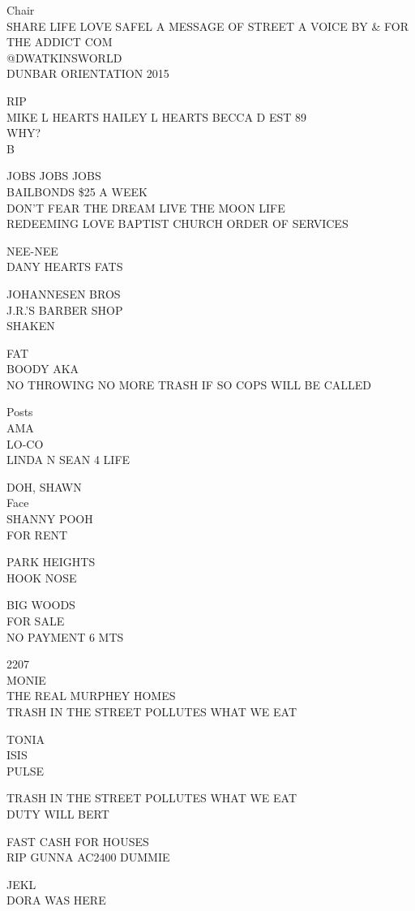 \documentclass[10pt,letterpaper]{article}
\begin{document}
Chair\\
SHARE LIFE LOVE SAFEL A MESSAGE OF STREET A VOICE BY \& FOR THE ADDICT COM\\
@DWATKINSWORLD\\
DUNBAR ORIENTATION 2015

RIP\\
MIKE L HEARTS HAILEY L HEARTS BECCA D EST 89\\
WHY?\\
B

JOBS JOBS JOBS\\
BAILBONDS \$25 A WEEK\\
DON'T FEAR THE DREAM LIVE THE MOON LIFE\\
REDEEMING LOVE BAPTIST CHURCH ORDER OF SERVICES

NEE{-}NEE\\
DANY HEARTS FATS

JOHANNESEN BROS\\
J.R.'S BARBER SHOP\\
SHAKEN

FAT\\
BOODY AKA\\
NO THROWING NO MORE TRASH IF SO COPS WILL BE CALLED

Posts\\
AMA\\
LO{-}CO\\
LINDA N SEAN 4 LIFE

DOH, SHAWN\\
Face\\
SHANNY POOH\\
FOR RENT

PARK HEIGHTS\\
HOOK NOSE

BIG WOODS\\
FOR SALE\\
NO PAYMENT 6 MTS

2207\\
MONIE\\
THE REAL MURPHEY HOMES\\
TRASH IN THE STREET POLLUTES WHAT WE EAT

TONIA\\
ISIS\\
PULSE

TRASH IN THE STREET POLLUTES WHAT WE EAT\\
DUTY WILL BERT

FAST CASH FOR HOUSES\\
RIP GUNNA AC2400 DUMMIE

JEKL\\
DORA WAS HERE
\end{document}
